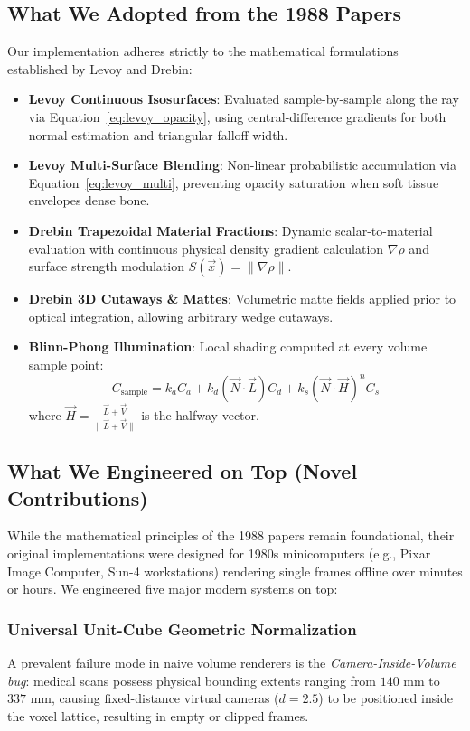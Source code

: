 \documentclass[10pt,twocolumn,a4paper]{article}
\begin{document}
\subsection{What We Adopted from the 1988 Papers}
Our implementation adheres strictly to the mathematical formulations established by Levoy and Drebin:
\begin{itemize}
    \item \textbf{Levoy Continuous Isosurfaces}: Evaluated sample-by-sample along the ray via Equation~\eqref{eq:levoy_opacity}, using central-difference gradients for both normal estimation and triangular falloff width.
    \item \textbf{Levoy Multi-Surface Blending}: Non-linear probabilistic accumulation via Equation~\eqref{eq:levoy_multi}, preventing opacity saturation when soft tissue envelopes dense bone.
    \item \textbf{Drebin Trapezoidal Material Fractions}: Dynamic scalar-to-material evaluation with continuous physical density gradient calculation $\nabla \rho$ and surface strength modulation $S(\vec{x}) = \|\nabla \rho\|$.
    \item \textbf{Drebin 3D Cutaways \& Mattes}: Volumetric matte fields applied prior to optical integration, allowing arbitrary wedge cutaways.
    \item \textbf{Blinn-Phong Illumination}: Local shading computed at every volume sample point:
    \begin{equation}
    C_{\text{sample}} = k_a C_a + k_d (\vec{N} \cdot \vec{L}) C_d + k_s (\vec{N} \cdot \vec{H})^n C_s
    \end{equation}
    where $\vec{H} = \frac{\vec{L} + \vec{V}}{\|\vec{L} + \vec{V}\|}$ is the halfway vector.
\end{itemize}

\subsection{What We Engineered on Top (Novel Contributions)}
While the mathematical principles of the 1988 papers remain foundational, their original implementations were designed for 1980s minicomputers (e.g., Pixar Image Computer, Sun-4 workstations) rendering single frames offline over minutes or hours. We engineered five major modern systems on top:

\subsubsection{Universal Unit-Cube Geometric Normalization}
A prevalent failure mode in naive volume renderers is the \textit{Camera-Inside-Volume bug}: medical scans possess physical bounding extents ranging from $140\text{ mm}$ to $337\text{ mm}$, causing fixed-distance virtual cameras ($d=2.5$) to be positioned inside the voxel lattice, resulting in empty or clipped frames. 
\end{document}
